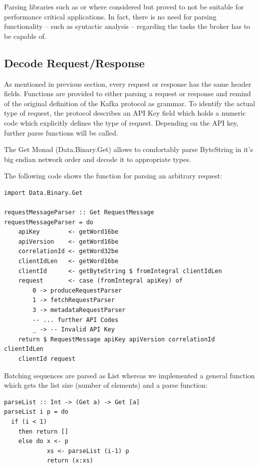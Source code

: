 Parsing libraries such as
 or
 where considered but
proved to not be suitable for performance critical applications. In fact, there
is no need for parsing functionality -- such as syntactic analysis -- regarding
the tasks the broker has to be capable of. 

\subsection{Decode Request/Response}

As mentioned in previous section, every request or response has the same header
fields. Functions are provided to either parsing a request or response and
remind of the original definition of the Kafka protocol as grammar. To identify
the actual type of request, the protocol describes an API Key field which holds
a numeric code which explicitly defines the type of request. Depending on the
API key, further parse functions will be called. 

The Get Monad (Data.Binary.Get) allows to comfortably parse ByteString in
it's big endian network order and decode it to appropriate types.

The following code shows the function for parsing an arbitrary request:

\begin{lstlisting}
import Data.Binary.Get

requestMessageParser :: Get RequestMessage 
requestMessageParser = do 
    apiKey        <- getWord16be
    apiVersion    <- getWord16be
    correlationId <- getWord32be
    clientIdLen   <- getWord16be
    clientId      <- getByteString $ fromIntegral clientIdLen
    request       <- case (fromIntegral apiKey) of
        0 -> produceRequestParser
        1 -> fetchRequestParser
        3 -> metadataRequestParser
        -- ... further API Codes 
        _ -> -- Invalid API Key 
    return $ RequestMessage apiKey apiVersion correlationId clientIdLen
    clientId request
\end{lstlisting}




Batching sequences are parsed as List whereas we implemented a general function
which gets the list size (number of elements) and a parse function: 
\begin{lstlisting}
parseList :: Int -> (Get a) -> Get [a]
parseList i p = do 
  if (i < 1) 
    then return []
    else do x <- p
            xs <- parseList (i-1) p
            return (x:xs)
\end{lstlisting}

